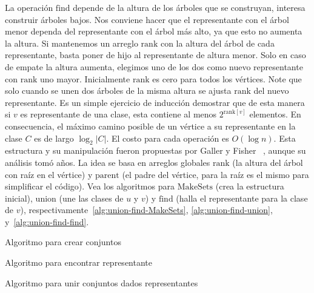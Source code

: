   La operación \(\mathrm{find}\) depende de la altura
  de los árboles que se construyan,
  interesa construir árboles bajos.
  Nos conviene hacer que el representante con el árbol menor
  dependa del representante con el árbol más alto,
  ya que esto no aumenta la altura.
  Si mantenemos un arreglo \(\mathrm{rank}\) con la altura del árbol
  de cada representante,
  basta poner de hijo al representante de altura menor.
  Solo en caso de empate la altura aumenta,
  elegimos uno de los dos como nuevo representante
  con \(\mathrm{rank}\) uno mayor.
  Inicialmente \(\mathrm{rank}\) es cero para todos los vértices.
  Note que solo cuando se unen dos árboles de la misma altura
  se ajusta \(\mathrm{rank}\) del nuevo representante.
  Es un simple ejercicio de inducción demostrar que de esta manera
  si \(v\) es representante de una clase,
  esta contiene al menos \(2^{\mathrm{rank}[v]}\) elementos.
  En consecuencia,
  el máximo camino posible de un vértice a su representante en la clase \(C\)
  es de largo \(\log_2 \lvert C \rvert\).
  El costo para cada operación es \(O(\log n)\).
  Esta estructura y su manipulación fueron propuestas por
  Galler y Fisher~%
    \cite{galler64:_improved_equiv_algorithm},
  aunque su análisis tomó años.
  La idea se basa en arreglos globales \(\mathrm{rank}\)
  (la altura del árbol con raíz en el vértice)
  y \(\mathrm{parent}\)
  (el padre del vértice,
   para la raíz es el mismo para simplificar el código).
  Vea los algoritmos
  para \(\mathrm{MakeSets}\)
  (crea la estructura inicial),
  \(\mathrm{union}\)
  (une las clases de \(u\) y \(v\))
  y \(\mathrm{find}\)
  (halla el representante para la clase de \(v\)),
  respectivamente~\ref{alg:union-find-MakeSets},
  \ref{alg:union-find-union},
  y~\ref{alg:union-find-find}.
  \begin{algorithm}[ht]
    \DontPrintSemicolon\Indp

    \caption{Algoritmo para crear conjuntos}
    \label{alg:union-find-MakeSets}
  \end{algorithm}
  \begin{algorithm}[ht]
    \DontPrintSemicolon\Indp

    \caption{Algoritmo para encontrar representante}
    \label{alg:union-find-find}
  \end{algorithm}
  \begin{algorithm}[ht]
    \DontPrintSemicolon\Indp

    \caption{Algoritmo para unir conjuntos dados representantes}
    \label{alg:union-find-union}
  \end{algorithm}

